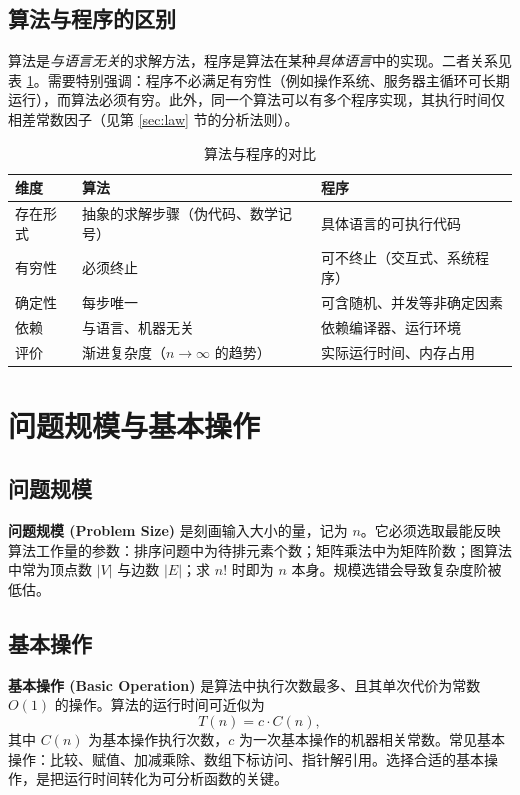 \subsection{算法与程序的区别}

算法是\emph{与语言无关}的求解方法，程序是算法在某种\emph{具体语言}中的实现。二者关系见表 \ref{tab:algo_vs_prog}。需要特别强调：程序不必满足有穷性（例如操作系统、服务器主循环可长期运行），而算法必须有穷。此外，同一个算法可以有多个程序实现，其执行时间仅相差常数因子（见第 \ref{sec:law} 节的分析法则）。

\begin{table}[H]
\centering
\caption{算法与程序的对比}
\label{tab:algo_vs_prog}
\begin{tabularx}{\textwidth}{l X X}
\toprule
维度 & 算法 & 程序 \\
\midrule
存在形式 & 抽象的求解步骤（伪代码、数学记号） & 具体语言的可执行代码 \\
有穷性 & 必须终止 & 可不终止（交互式、系统程序） \\
确定性 & 每步唯一 & 可含随机、并发等非确定因素 \\
依赖 & 与语言、机器无关 & 依赖编译器、运行环境 \\
评价 & 渐进复杂度（$n\to\infty$ 的趋势） & 实际运行时间、内存占用 \\
\bottomrule
\end{tabularx}
\end{table}

\section{问题规模与基本操作}

\subsection{问题规模}

\textbf{问题规模 (Problem Size)} 是刻画输入大小的量，记为 $n$。它必须选取最能反映算法工作量的参数：排序问题中为待排元素个数；矩阵乘法中为矩阵阶数；图算法中常为顶点数 $|V|$ 与边数 $|E|$；求 $n!$ 时即为 $n$ 本身。规模选错会导致复杂度阶被低估。

\subsection{基本操作}

\textbf{基本操作 (Basic Operation)} 是算法中执行次数最多、且其单次代价为常数 $O(1)$ 的操作。算法的运行时间可近似为
\begin{equation}
T(n)=c\cdot C(n),
\end{equation}
其中 $C(n)$ 为基本操作执行次数，$c$ 为一次基本操作的机器相关常数。常见基本操作：比较、赋值、加减乘除、数组下标访问、指针解引用。选择合适的基本操作，是把运行时间转化为可分析函数的关键。

